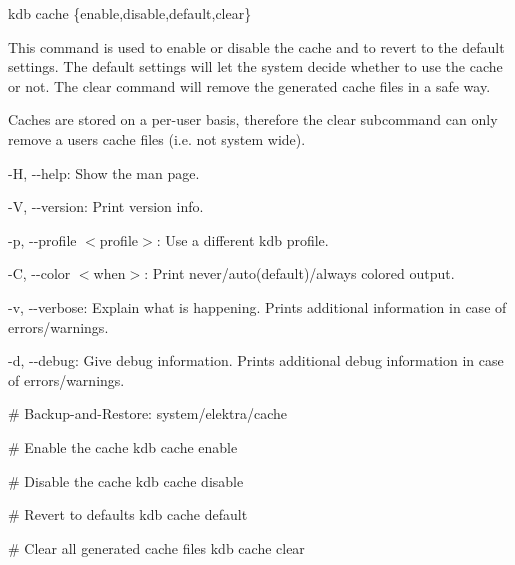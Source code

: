 {\ttfamily kdb cache \{enable,disable,default,clear\}}

This command is used to enable or disable the cache and to revert to the default settings. The default settings will let the system decide whether to use the cache or not. The clear command will remove the generated cache files in a safe way.

Caches are stored on a per-\/user basis, therefore the {\ttfamily clear} subcommand can only remove a user\textquotesingle{}s cache files (i.\+e. not system wide).


\begin{DoxyItemize}
\item {\ttfamily -\/H}, {\ttfamily -\/-\/help}\+: Show the man page.
\item {\ttfamily -\/V}, {\ttfamily -\/-\/version}\+: Print version info.
\item {\ttfamily -\/p}, {\ttfamily -\/-\/profile $<$profile$>$}\+: Use a different kdb profile.
\item {\ttfamily -\/C}, {\ttfamily -\/-\/color $<$when$>$}\+: Print never/auto(default)/always colored output.
\item {\ttfamily -\/v}, {\ttfamily -\/-\/verbose}\+: Explain what is happening. Prints additional information in case of errors/warnings.
\item {\ttfamily -\/d}, {\ttfamily -\/-\/debug}\+: Give debug information. Prints additional debug information in case of errors/warnings.
\end{DoxyItemize}


\begin{DoxyCode}
# Backup-and-Restore: system/elektra/cache

# Enable the cache
kdb cache enable

# Disable the cache
kdb cache disable

# Revert to defaults
kdb cache default

# Clear all generated cache files
kdb cache clear
\end{DoxyCode}
 